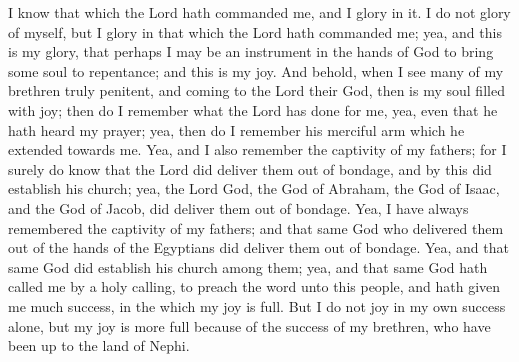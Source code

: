 I know that which the Lord hath commanded me, and I glory in it. I do not glory of myself, but I glory in that which the Lord hath commanded me; yea, and this is my glory, that perhaps I may be an instrument in the hands of God to bring some soul to repentance; and this is my joy.
\bverse \iffalse And behold, when I see many of my brethren truly penitent, and coming to the Lord their God, then is my soul filled with joy; then do I remember what the Lord has done for me, yea, even that he hath heard my prayer; yea, then do I remember his merciful arm which he extended towards me. \fi
And behold, when I see many of my brethren truly penitent, and coming to the Lord their God, then is my soul filled with joy; then do I remember what the Lord has done for me, yea, even that he hath heard my prayer; yea, then do I remember his merciful arm which he extended towards me.
\bverse \iffalse Yea, and I also remember the captivity of my fathers; for I surely do know that the Lord did deliver them out of bondage, and by this did establish his church; yea, the Lord God, the God of Abraham, the God of Isaac, and the God of Jacob, did deliver them out of bondage. \fi
Yea, and I also remember the captivity of my fathers; for I surely do know that the Lord did deliver them out of bondage, and by this did establish his church; yea, the Lord God, the God of Abraham, the God of Isaac, and the God of Jacob, did deliver them out of bondage.
\bverse \iffalse Yea, I have always remembered the captivity of my fathers; and that same God who delivered them out of the hands of the Egyptians did deliver them out of bondage. \fi
Yea, I have always remembered the captivity of my fathers; and that same God who delivered them out of the hands of the Egyptians did deliver them out of bondage.
\bverse \iffalse Yea, and that same God did establish his church among them; yea, and that same God hath called me by a holy calling, to preach the word unto this people, and hath given me much success, in the which my joy is full. \fi
Yea, and that same God did establish his church among them; yea, and that same God hath called me by a holy calling, to preach the word unto this people, and hath given me much success, in the which my joy is full.
\bverse \iffalse But I do not joy in my own success alone, but my joy is more full because of the success of my brethren, who have been up to the land of Nephi. \fi
But I do not joy in my own success alone, but my joy is more full because of the success of my brethren, who have been up to the land of Nephi.
